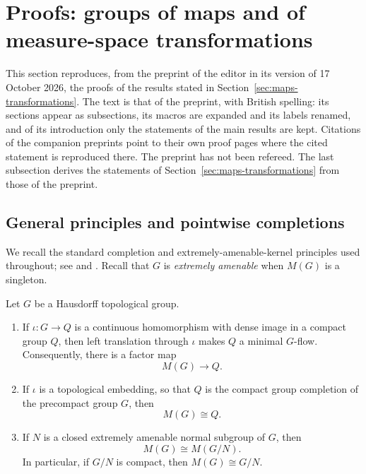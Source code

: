\section{Proofs: groups of maps and of measure-space transformations}\label{sec:proofs-maps-transformations}

This section reproduces, from the preprint of the editor \cite{LupiniPointwise2026} in its version of 17 October 2026, the
proofs of the results stated in Section~\ref{sec:maps-transformations}. The text is that of the
preprint, with British spelling: its sections appear as subsections, its macros
are expanded and its labels renamed, and of its introduction only the
statements of the main results are kept. Citations of the companion preprints
point to their own proof pages where the cited statement is reproduced there.
The preprint has not been refereed. The last subsection derives the statements
of Section~\ref{sec:maps-transformations} from those of the preprint.

\subsection{General principles and pointwise completions}
\label{sec:pw-umf}

We recall the standard completion and extremely-amenable-kernel principles
used throughout; see \cite[Example~6.1.8 and Theorem~6.2.9]{Pestov2006} and
\cite[Lemma~2.3 and Corollary~2.5]{PestovRemarks2002}. Recall that \(G\) is \emph{extremely amenable} when \(M(G)\) is a
singleton.

\begin{lemma}\label{lem:pw-umf-principles}
Let \(G\) be a Hausdorff topological group.
\begin{enumerate}
\item If \(\iota:G\to Q\) is a continuous homomorphism with dense image in a
compact group \(Q\), then left translation through \(\iota\) makes \(Q\) a
minimal \(G\)-flow. Consequently, there is a factor map
\[
M(G)\longrightarrow Q.
\]
\item If \(\iota\) is a topological embedding, so that \(Q\) is the compact
group completion of the precompact group \(G\), then
\[
M(G)\cong Q.
\]
\item If \(N\) is a closed extremely amenable normal subgroup of \(G\), then
\[
M(G)\cong M(G/N).
\]
In particular, if \(G/N\) is compact, then \(M(G)\cong G/N\).
\end{enumerate}
\end{lemma}

